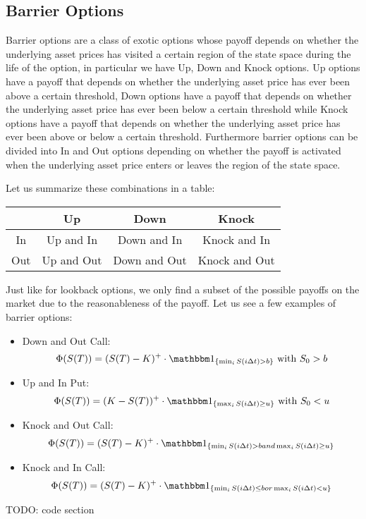 \subsection*{Barrier Options}
Barrier options are a class of exotic options whose payoff depends on whether
the underlying asset prices has visited a certain region of the state space
during the life of the option, in particular we have Up, Down and Knock options.
Up options have a payoff that depends on whether the underlying asset price has
ever been above a certain threshold, Down options have a payoff that depends on
whether the underlying asset price has ever been below a certain threshold while
Knock options have a payoff that depends on whether the underlying asset price
has ever been above or below a certain threshold. Furthermore barrier options
can be divided into In and Out options depending on whether the payoff is
activated when the underlying asset price enters or leaves the region of the
state space.

Let us summarize these combinations in a table:

\begin{center}
    \begin{tabular}{|c|c|c|c|}
        \hline
        & Up & Down & Knock \\
        \hline
        In & Up and In & Down and In & Knock and In \\
        \hline
        Out & Up and Out & Down and Out & Knock and Out \\
        \hline
    \end{tabular}
\end{center}

Just like for lookback options, we only find a subset of the possible payoffs
on the market due to the reasonableness of the payoff. Let us see a few examples
of barrier options:

\begin{itemize}
    \item Down and Out Call:
        \[ \Phi(S(T)) = (S(T)-K)^+ \cdot \I_{\{ \min_i S(i\Delta t) > b \}}
        \text{ with } S_0 > b \]
    \item Up and In Put:
        \[ \Phi(S(T)) = (K-S(T))^+ \cdot \I_{\{ \max_i S(i\Delta t) \geq u \}}
        \text{ with } S_0 < u \]
    \item Knock and Out Call:
        \[ \Phi(S(T)) = (S(T)-K)^+ \cdot \I_{\{ \min_i S(i\Delta t) > b and
        \max_i S(i\Delta t) \geq u \}} \]
    \item Knock and In Call:
        \[ \Phi(S(T)) = (S(T)-K)^+ \cdot \I_{\{ \min_i S(i\Delta t) \leq b or
        \max_i S(i\Delta t) < u \}} \]
\end{itemize}

TODO: code section


